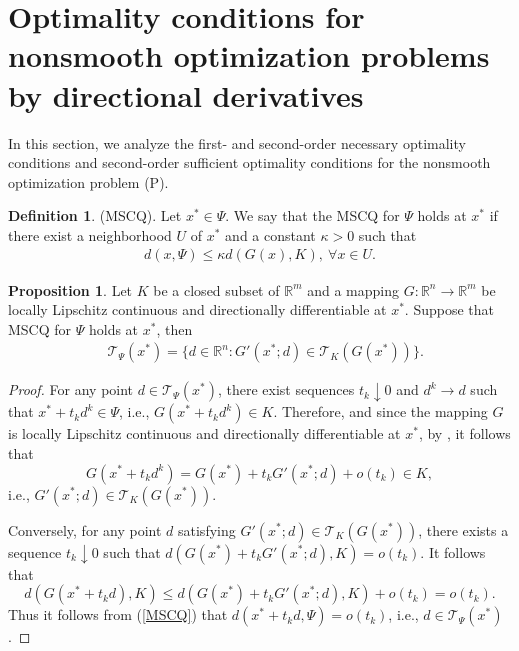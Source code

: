 \documentclass[11pt]{article}
\theoremstyle{definition}
\newtheorem{definition}[theorem]{Definition}
\newtheorem{proposition}[theorem]{Proposition}
\theoremstyle{remark}
\numberwithin{equation}{section}
\begin{document}
\section{Optimality conditions for nonsmooth optimization problems by directional derivatives}\label{section 3}

In this section, we analyze the first- and second-order necessary optimality conditions and  second-order
 sufficient optimality conditions for the nonsmooth optimization problem (P).

\begin{definition}\label{def MSCQ}(MSCQ). Let $x^*\in \Psi$. We say that
the MSCQ for $\Psi$ holds at $x^*$ if there exist a neighborhood
$U$ of $x^*$ and a constant $\kappa>0$ such that
\begin{align}\label{MSCQ}
  d(x,\Psi)\le \kappa d(G(x),K),\ \forall x\in U.
\end{align}
\end{definition}

\begin{proposition}\label{prop-tangent cone=linearized}
 Let $K$ be a closed subset of $\mathbb{R}^m$ and a mapping $G:\mathbb{R}^n\to \mathbb{R}^m$ be locally Lipschitz
 continuous and directionally differentiable at $x^*$. Suppose that MSCQ for $\Psi$ holds at $x^*$, then
  \begin{align}\label{tangent cone}
   &\mathcal{T}_{\Psi}(x^*)=\{d\in \mathbb{R}^n:G'(x^*;d)\in \mathcal{T}_{K}(G(x^*))\}.
  \end{align}
  \end{proposition}
\begin{proof}
  For any point $d\in \mathcal{T}_{\Psi}(x^*)$, there exist sequences $t_k\downarrow 0$ and $d^k\to d$ such that
   $x^*+t_k d^k\in \Psi$, i.e., $G(x^*+t_k d^k)\in K$. Therefore, and since the mapping $G$ is locally Lipschitz
   continuous and directionally differentiable at $x^*$, by \cite[Proposition 2.49]{Bonnans}, it follows that
   $$G(x^*+t_k d^k)=G(x^*)+t_k G'(x^*;d)+o(t_k)\in K,$$ i.e., $G'(x^*;d)\in \mathcal{T}_{K}(G(x^*))$.

   Conversely, for any point $d$ satisfying $G'(x^*;d)\in \mathcal{T}_{K}(G(x^*))$, there exists a sequence
   $t_k\downarrow 0$ such that $d(G(x^*)+t_k G'(x^*;d),K)=o(t_k)$.  It follows  that
   $$
   d(G(x^*+t_k d),K)\le d(G(x^*)+t_k G'(x^*;d),K)+o(t_k)=o(t_k).
   $$
   Thus it follows from (\ref{MSCQ}) that $d(x^*+t_k d,\Psi)= o(t_k)$, i.e., $d\in \mathcal{T}_{\Psi}(x^*)$.
 \end{proof}
\end{document}
